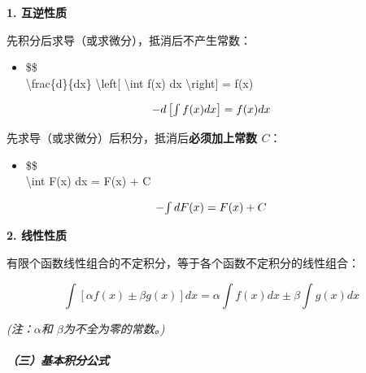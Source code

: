 \documentclass[
]{article}
\begin{document}
\textbf{1. 互逆性质}

先积分后求导（或求微分），抵消后不产生常数：

\begin{itemize}
\item
  \$\$\\
  \textbackslash frac\{d\}\{dx\} \textbackslash left{[}
  \textbackslash int f(x) dx \textbackslash right{]} = f(x)
\end{itemize}

\[- $$
d \left[ \int f(x) dx \right] = f(x)dx\]

先求导（或求微分）后积分，抵消后\textbf{必须加上常数 \(C\)}：

\begin{itemize}
\item
  \$\$\\
  \textbackslash int F\textquotesingle(x) dx = F(x) + C
\end{itemize}

\[- $$
\int dF(x) = F(x) + C\]

\textbf{2. 线性性质}

有限个函数线性组合的不定积分，等于各个函数不定积分的线性组合：

\[\int [\alpha f(x) \pm \beta g(x)] dx = \alpha \int f(x) dx \pm \beta \int g(x) dx\]

\emph{(注：\(\alpha\)和 \(\beta\)为不全为零的常数。)}

\subparagraph{（三）基本积分公式}\label{ux4e09uxff09ux57faux672cux79efux5206ux516cux5f0f}
\end{document}
